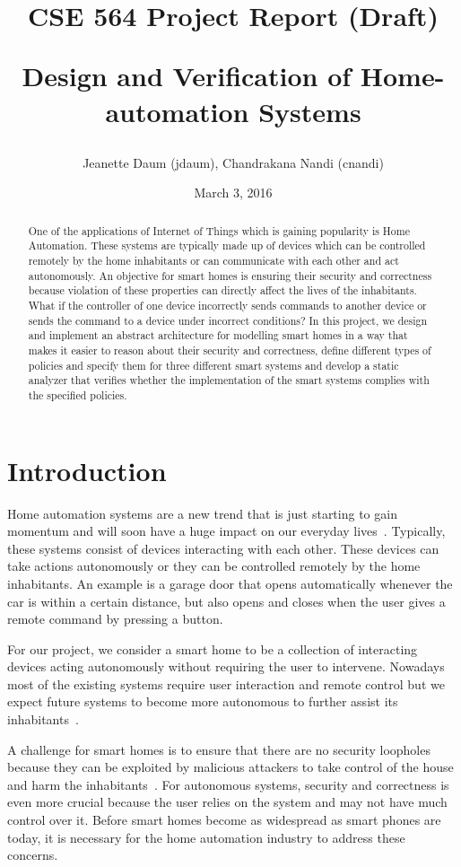 \documentclass{article}
\title{\textbf{CSE 564 Project Report (Draft)} 
\\
\begin{center}
\LARGE{Design and Verification of Home-automation Systems}
\end{center}\vspace{-2ex}}
\author{Jeanette Daum (jdaum), Chandrakana Nandi (cnandi) }
\date{March 3, 2016}
\begin{document}
\maketitle
\begin{abstract}
One of the applications of Internet of Things which is gaining popularity is Home Automation. These systems are typically made up of devices which can be controlled remotely by the home inhabitants or can communicate with each other and act autonomously. An objective for smart homes is ensuring their security and correctness because violation of these properties can directly affect the lives of the inhabitants. What if the controller of one device incorrectly sends commands to another device or sends the command to a device under incorrect conditions? In this project, we design and implement an abstract architecture for modelling smart homes in a way that makes it easier to reason about their security and correctness, define different types of policies and specify them for three different smart systems and develop a static analyzer that verifies whether the implementation of the smart systems complies with the specified policies. 

\end{abstract}
\section{Introduction}
Home automation systems are a new trend that is just starting to gain momentum and will soon have a huge impact on our everyday lives~\cite{samsung, homekit, echo, wink, homeos}. Typically, these systems consist of devices interacting with each other. These devices can take actions autonomously or they can be controlled remotely by the home inhabitants. An example is a garage door that opens automatically whenever the car is within a certain distance, but also opens and closes when the user gives a remote command by pressing a button. 

For our project, we consider a smart home to be a collection of interacting devices acting autonomously without requiring the user to intervene. Nowadays most of the existing systems require user interaction and remote control but we expect future systems to become more autonomous to further assist its inhabitants~\cite{homekit}.

A challenge for smart homes is to ensure that there are no security loopholes because they can be exploited by malicious attackers to take control of the house and harm the inhabitants~\cite{yoshi, jung}. For autonomous systems, security and correctness is even more crucial because the user relies on the system and may not have much control over it. Before smart homes become as widespread as smart phones are today, it is necessary for the home automation industry to address these concerns.
\end{document}
